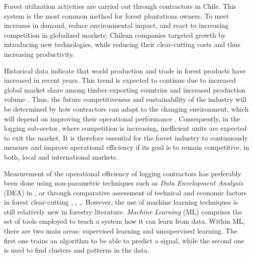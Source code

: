 \documentclass[conference]{IEEEtran}
\begin{document}
Forest utilization activities are carried out through contractors in Chile. This system is the most common method for forest plantations owners. To meet increases in demand, reduce environmental impact, and react to increasing competition in globalized markets, Chilean companies targeted growth by introducing new technologies, while reducing their clear-cutting costs and thus increasing productivity.

Historical data indicate that world production and trade in forest products have increased in recent years. This trend is expected to continue due to increased global market share among timber-exporting countries and increased production volume \cite{Hashiramotois_2004}. Thus, the future competitiveness and sustainability of the industry will be determined by how contractors can adapt to the changing environment, which will depend on improving their operational performance \cite{vahid_2007}. Consequently, in the logging sub-sector, where competition is increasing, inefficient units are expected to exit the market. It is therefore essential for the forest industry to continuously measure and improve operational efficiency if its goal is to remain competitive, in both, local and international markets.

Measurement of the operational efficiency of logging contractors has preferably been done using non-parametric techniques such as \textit{Data Envelopment Analysis} (DEA) in \cite{obi_2017}, \cite{trzcianowska_2019} or through comparative assessment of technical and economic factors in forest clear-cutting \cite{di_fulvio_2017_benchmarking}, \cite{eriksson_2015_management}, \cite{keefe_2019_smartphone},\cite{mac_2017_harvesting}. However, the use of machine learning techniques is still relatively new in forestry literature. \textit{Machine Learning} (ML) comprises the set of tools employed to teach a system how it can learn from data. Within ML, there are two main areas: supervised learning and unsupervised learning. The first one trains an algorithm to be able to predict a signal, while the second one is used to find clusters and patterns in the data.
\end{document}
